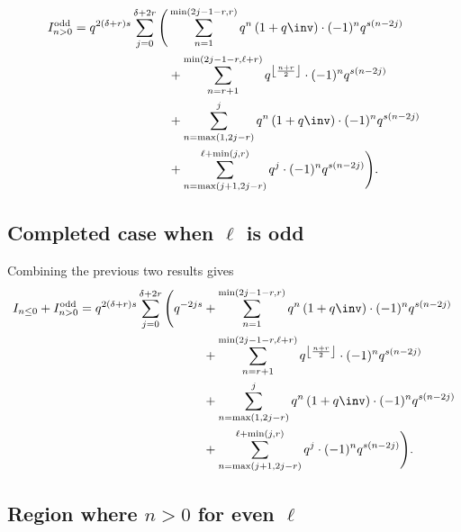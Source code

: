 \begin{align*}
  I_{n > 0}^{\text{odd}}
  = q^{2(\delta+r)s}
  \sum_{j = 0}^{\delta + 2r} \Bigg(
    & \sum_{n=1}^{\min(2j-1-r, r)}
      q^{n} \left( 1 + q\inv \right) \cdot (-1)^n q^{s(n-2j)} \\
    & + \sum_{n=r+1}^{\min(2j-1-r, \ell+r)}
      q^{\left\lfloor \frac{n+r}{2} \right\rfloor} \cdot (-1)^n q^{s(n-2j)} \\
    &+ \sum_{n=\max(1,2j-r)}^{j}
      q^{n} \left( 1 + q\inv \right) \cdot (-1)^n q^{s(n-2j)} \\
    &+ \sum_{n=\max(j+1, 2j-r)}^{\ell+\min(j,r)} q^{j} \cdot (-1)^n q^{s(n-2j)} \Bigg).
\end{align*}

\subsection{Completed case when $\ell$ is odd}
Combining the previous two results gives
\begin{align*}
  I_{n \le 0} + I_{n > 0}^{\text{odd}}
  = q^{2(\delta+r)s}
  \sum_{j = 0}^{\delta + 2r} \Bigg(
    q^{-2js}
    &+ \sum_{n=1}^{\min(2j-1-r, r)}
      q^{n} \left( 1 + q\inv \right) \cdot (-1)^n q^{s(n-2j)} \\
    &+ \sum_{n=r+1}^{\min(2j-1-r, \ell+r)}
      q^{\left\lfloor \frac{n+r}{2} \right\rfloor} \cdot (-1)^n q^{s(n-2j)} \\
    &+ \sum_{n=\max(1,2j-r)}^{j}
      q^{n} \left( 1 + q\inv \right) \cdot (-1)^n q^{s(n-2j)} \\
    &+ \sum_{n=\max(j+1, 2j-r)}^{\ell+\min(j,r)} q^{j} \cdot (-1)^n q^{s(n-2j)} \Bigg).
\end{align*}

\subsection{Region where $n > 0$ for even $\ell$}
